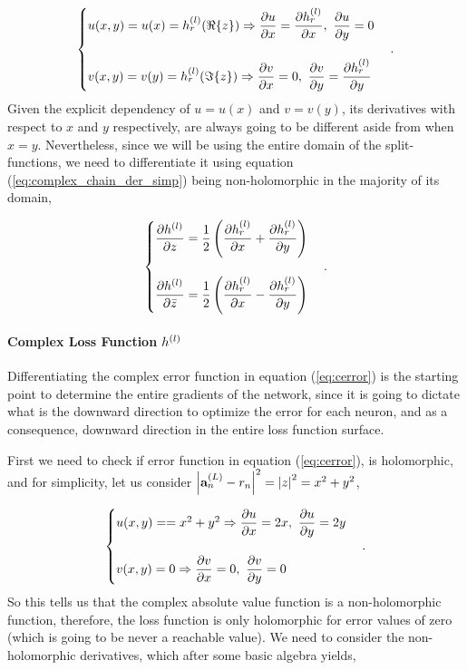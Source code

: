\begin{equation}
	\begin{cases}
		u(x,y) = u(x) = \af{l}_r(\Real{z}) \Rightarrow \der{u}{x} = \der{\af{l}_r}{x}, \ \der{u}{y} = 0 \\
		\\
		v(x,y) = v(y) = \af{l}_r(\Imag{z}) \Rightarrow \der{v}{x} = 0, \ \der{v}{y} = \der{\af{l}_r}{y}
	\end{cases}.
\end{equation}
Given the explicit dependency of $ u = u(x) $ and $ v = v(y) $, its derivatives with respect to $ x $ and $ y $ respectively, are always going to be different aside from when $ x = y $. Nevertheless, since we will be using the entire domain of the split-functions, we need to differentiate it using equation
(\ref{eq:complex_chain_der_simp}) being non-holomorphic in the majority of its domain,

\begin{equation}
	\begin{cases}
		\dfrac{\partial h^{(l)}}{\partial z} = \dfrac{1}{2} \left( \dfrac{\partial h^{(l)}_r}{\partial x} + \dfrac{\partial h^{(l)}_r}{\partial y} \right) \\
		\\
		\dfrac{\partial h^{(l)}}{\partial \bar{z}} = \dfrac{1}{2} \left( \dfrac{\partial h^{(l)}_r}{\partial x} - \dfrac{\partial h^{(l)}_r}{\partial y} \right)
	\end{cases}.
\end{equation}

\paragraph{Complex Loss Function $ h^{(l)} $}
Differentiating the complex error function in equation (\ref{eq:cerror}) is the starting point to determine the entire gradients of the network, since it is going to dictate what is the downward direction to optimize the error for each neuron, and as a consequence, downward direction in the entire loss function surface.

First we need to check if error function in equation (\ref{eq:cerror}), is holomorphic, and for simplicity, let us consider $ \left| \mathbf{a}^{(L)}_{n} - r_n \right|^2 = \left| z \right|^2 = x^2 + y^2 $,

\begin{equation}
	\begin{cases}
		u(x,y) =  = x^2 + y^2 \Rightarrow \dfrac{\partial u}{\partial x} = 2x, \ \dfrac{\partial u}{\partial y} = 2y \\
		\\
		v(x,y) = 0 \Rightarrow \dfrac{\partial v}{\partial x} = 0, \ \dfrac{\partial v}{\partial y} = 0
	\end{cases}.
\end{equation}
So this tells us that the complex absolute value function is a non-holomorphic function, therefore, the loss function is only holomorphic for error values of zero (which is going to be never a reachable value). We need to consider the non-holomorphic derivatives, which after some basic algebra yields,

